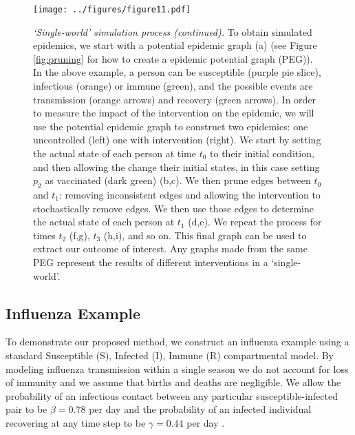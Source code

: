 \documentclass[PTRSB]{rsos}
\begin{document}
\begin{multicols}{2}
\begin{figure}[hp]
\texttt{[image: ../figures/figure11.pdf]}
\caption{\textit{‘Single-world’ simulation process (continued).}
  To obtain simulated epidemics, we start with a potential epidemic graph (a) (see Figure \ref{fig:pruning} for how to create a epidemic potential graph (PEG)).
  In the above example, a person can be susceptible (purple pie slice), infectious (orange) or immune (green), and the possible events are transmission (orange arrows) and recovery (green arrows).
  In order to measure the impact of the intervention on the epidemic, we will use the potential epidemic graph to construct two epidemics: one uncontrolled (left) one with intervention (right).
  We start by setting the actual state of each person at time $t_0$ to their initial condition, and then allowing the change their initial states, in this case setting $p_2$ as vaccinated (dark green) (b,c).
  We then prune edges between $t_0$ and $t_1$: removing inconsistent edges and allowing the intervention to stochastically remove edges.
  We then use those edges to determine the actual state of each person at $t_1$ (d,e).
  We repeat the process for times $t_2$ (f,g), $t_3$ (h,i), and so on.
  This final graph can be used to extract our outcome of interest.
  Any graphs made from the same PEG represent the results of different interventions in a `single-world'.
}
\label{fig:actualizing}
\end{figure}

\subsection*{Influenza Example}
To demonstrate our proposed method, we construct an influenza example using a standard Susceptible (S), Infected (I), Immune (R) compartmental model.
By modeling influenza transmission within a single season we do not account for loss of immunity and we assume that births and deaths are negligible.
We allow the probability of an infectious contact between any particular susceptible-infected pair to be $\beta = 0.78$ per day and the probability of an infected individual recovering at any time step to be $\gamma = 0.44$ per day \cite{forsberg-white-et-al:2009}.


\end{multicols}
\end{document}
